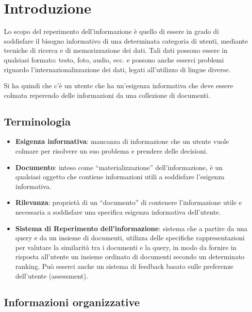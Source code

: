 

\chapter{Introduzione}

Lo scopo del reperimento dell'informazione è quello di essere in grado di soddisfare il bisogno informativo di una determinata categoria di utenti, mediante tecniche di ricerca e di memorizzazione dei dati.
Tali dati possono essere in qualsiasi formato: testo, foto, audio, ecc. e possono anche esserci problemi riguardo l'internazionalizzazione dei dati, legati all'utilizzo di lingue diverse.

Si ha quindi che c'è un utente che ha un'esigenza informativa che deve essere colmata reperendo delle informazioni da una collezione di documenti.

\section{Terminologia}

\begin{itemize}
	\item \textbf{Esigenza informativa}: mancanza di informazione che un utente vuole colmare per risolvere un suo problema e prendere delle decisioni.
	\item \textbf{Documento}: inteso come ``materializzazione'' dell'informazione, è un qualsiasi oggetto che contiene informazioni utili a soddisfare l'esigenza informativa.
	\item \textbf{Rilevanza}: proprietà di un ``documento'' di contenere l'informazione utile e necessaria a soddisfare una specifica esigenza informativa dell'utente.
	\item \textbf{Sistema di Reperimento dell'informazione}: sistema che a partire da una query e da un insieme di documenti, utilizza delle specifiche rappresentazioni per valutare la similarità tra i documenti e la query, in modo da fornire in risposta all'utente un insieme ordinato di documenti secondo un determinato ranking. Può esserci anche un sistema di feedback basato sulle preferenze dell'utente (assessment).
\end{itemize}


\section{Informazioni organizzative}

